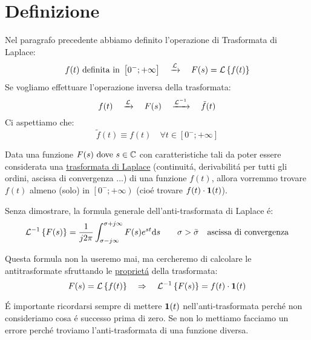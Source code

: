 \documentclass[../main.tex]{subfiles}
\begin{document}
	\section{Definizione}
		Nel paragrafo precedente abbiamo definito l'operazione di Trasformata di Laplace:
		\[
			\Lapl{f(t)\ \text{definita in}\ \left[ 0^-;+\infty \right]}{F(s)=\Lbrace{f(t)}}
		\]
		Se vogliamo effettuare l'operazione inversa della trasformata:
		\[
			f(t) \quad \xrightarrow{\mathcal{L}} \quad F(s)  \quad \xrightarrow{\mathcal{L}^{-1}} \quad  \tilde{f}(t)
		\]
		Ci aspettiamo che: 
		\[
			\tilde{f}(t) \equiv f(t) \quad \forall t \in \left[ 0^-;+\infty \right]
		\]
		
		Data una funzione $ F(s)\ \text{dove}\ s \in \mathbb{C} $ con caratteristiche tali da poter essere considerata una \hyperref[sec:trasformata_laplace]{trasformata di Laplace} (continuit\'{a}, derivabilit\'{a} per tutti gli ordini, ascissa di convergenza ...) di una funzione $ f(t) $, allora vorremmo trovare $ f(t) $ almeno (solo) in $ \left[ 0^-;+\infty \right) $ (cio\'{e} trovare $ f(t) \cdot \textbf{1}(t) $).
		
		Senza dimostrare, la formula generale dell'anti-trasformata di Laplace \'{e}:
		\[
			\mathcal{L}^{-1} \left\lbrace F(s) \right\rbrace = \frac{1}{j2\pi} \int_{ \sigma - j \infty }^{ \sigma + j \infty } F(s) e^{st} \mathrm{d}s \qquad \sigma > \bar{\sigma} \quad \text{ascissa di convergenza}
		\]
		
		Questa formula non la useremo mai, ma cercheremo di calcolare le antitrasformate sfruttando le \hyperref[subsec:prop_laplace]{propriet\'{a}} della trasformata:
		\[
			F(s) = \mathcal{L} \left\lbrace f(t) \right\rbrace \quad \Rightarrow \quad \mathcal{L}^{-1} \left\lbrace F(s) \right\rbrace = f(t) \cdot \textbf{1}(t)
		\]
		
		\'{E} importante ricordarsi sempre di mettere $ \textbf{1}(t) $ nell'anti-trasformata perch\'{e} non consideriamo cosa \'{e} successo prima di zero. Se non lo mettiamo facciamo un errore perch\'{e} troviamo l'anti-trasformata di una funzione diversa.
	
\end{document}
